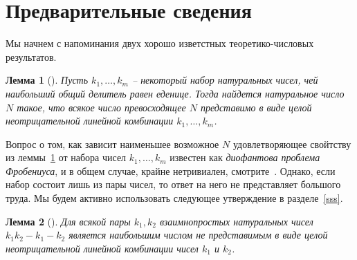 \documentclass[11pt]{article}
\newtheorem{lemma}{Лемма}
\begin{document}
\section{Предварительные сведения}
\label{preliminaries}

Мы начнем с напоминания двух хорошо изветстных теоретико-числовых результатов.


\begin{lemma}[{\mdseries\cite[Теорема 1.0.1]{RaAl05}}]
\label{schur}
Пусть $k_1,\dots,k_m$ -- некоторый набор натуральных чисел, чей наибольший общий
делитель равен еденице. Тогда найдется натуральное число $N$ такое, что всякое число
превосходящее $N$ представимо в виде целой неотрицательной линейной комбинации
$k_1,\dots,k_m$.
\end{lemma}


Вопрос о том, как зависит наименьшее возможное $N$ удовлетворяющее свойтству из леммы~\ref{schur}
от набора чисел $k_1,\dots,k_m$ известен как \emph{диофантова проблема Фробениуса},
и в общем случае, крайне нетривиален, смотрите~\cite{RaAl05}. Однако, если набор состоит
лишь из пары чисел, то ответ на него не представляет большого труда. Мы будем активно использовать
следующее утверждение в разделе~\ref{sss}.



\begin{lemma}[{\mdseries\cite[Теорема 2.1.1]{RaAl05}}]
\label{sylvester}
Для всякой пары $k_1,k_2$ взаимнопростых натуральных чисел $k_1k_2-k_1-k_2$ является
наибольшим числом не представимым в виде целой неотрицательной линейной комбинации 
чисел $k_1$ и $k_2$.
\end{lemma}
\end{document}
